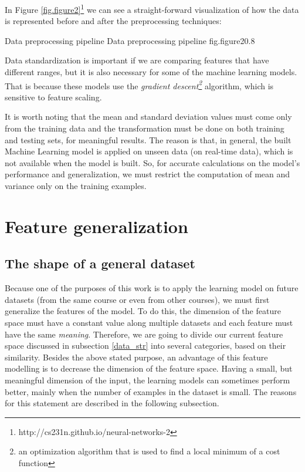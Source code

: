In Figure \ref{fig.figure2}\footnote{http://cs231n.github.io/neural-networks-2} we can 
see a straight-forward visualization of how the data is represented before and after 
the preprocessing techniques:

%
    {Data preprocessing pipeline}%
    {Data preprocessing pipeline}%
    {fig.figure2}{0.8}

Data standardization is important if we are comparing features that have different 
ranges, but it is also necessary for some of the machine learning models. That is 
because these models use the {\it gradient descent\footnote{an optimization algorithm
that is used to find a local minimum of a cost function}} algorithm, which is 
sensitive to feature scaling.

It is worth noting that the mean and standard deviation values must come only 
from the training data and the transformation must be done on both training and 
testing sets, for meaningful results. The reason is that, in general, the built 
Machine Learning model is applied on unseen data (on real-time data), which is 
not available when the model is built. So, for accurate calculations on the 
model's performance and generalization, we must restrict the computation of 
mean and variance only on the training examples.

\section{Feature generalization}

\subsection{The shape of a general dataset}
\label{dataset_gen}

Because one of the purposes of this work is to apply the learning model 
on future datasets (from the same course or even from other courses), 
we must first generalize the features of the model. To do this, the dimension 
of the feature space must have a constant value along multiple datasets 
and each feature must have the same {\it meaning}. Therefore, we are going 
to divide our current feature space discussed in subsection \ref{data_str} 
into several categories, based on their similarity. Besides the above stated 
purpose, an advantage of this feature modelling is to decrease the dimension 
of the feature space. Having a small, but meaningful dimension of the input, 
the learning models can sometimes perform better, mainly when the number of 
examples in the dataset is small. The reasons for this statement are described 
in the following subsection. 


